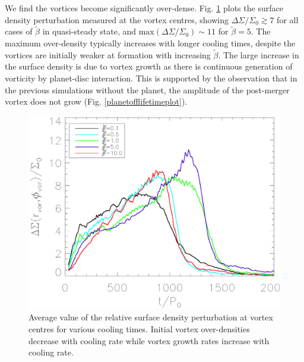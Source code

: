 We find the vortices become significantly 
over-dense. Fig. \ref{overdensity} plots the surface density perturbation measured at the
vortex centres, showing $\Delta\Sigma/\Sigma_0 \gtrsim 7$ for all
cases of $\tilde\beta$ in quasi-steady state, and 
$\mathrm{max}(\Delta\Sigma/\Sigma_0)\sim 11$ for $\tilde\beta=5$.  
The maximum over-density typically increases with longer cooling
times, despite the vortices are initially weaker at formation with
increasing $\tilde{\beta}$. The large increase in the surface density
is due to vortex growth as there is continuous generation of vorticity by
planet-disc interaction. This is supported by the observation that in
the previous simulations without the planet, the amplitude of
the post-merger vortex does not grow (Fig. 
\ref{planetofflifetimeplot}).  


\begin{figure}
  \includegraphics[width=\linewidth,clip=true,trim=0.5cm
  0cm 0cm 1cm]{figures/vortex_density}
  \caption{Average value of the relative surface density perturbation
    at vortex centres for various cooling
    times. Initial vortex over-densities decrease with cooling rate while
    vortex growth rates increase with cooling rate.
    \label{overdensity}}     
\end{figure}

